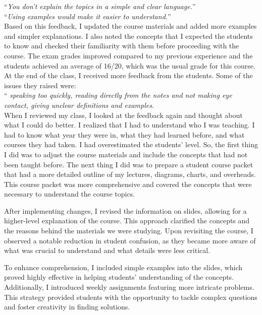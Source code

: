 “\emph {You don’t explain the topics in a simple and clear language.}”\\

“\emph {Using examples would make it easier to understand.}”\\

Based on this feedback, I updated the course materials and added more examples and simpler explanations. I also noted the concepts that I expected the students to know and checked their familiarity with them before proceeding with the course. The exam grades improved compared to my previous experience and the students achieved an average of 16/20, which was the usual grade for this course. At the end of the class, I received more feedback from the students. Some of the issues they raised were: \\

“\emph { speaking too quickly, reading directly from the notes and not making eye contact, giving unclear definitions and examples}.\\

 When I reviewed my class, I looked at the feedback again and thought about what I could do better. I realized that I had to understand who I was teaching. I had to know what year they were in, what they had learned before, and what courses they had taken. I had overestimated the students’ level. So, the first thing I did was to adjust the course materials and include the concepts that had not been taught before. The next thing I did was to prepare a student course packet that had a more detailed outline of my lectures, diagrams, charts, and overheads. This course packet was more comprehensive and covered the concepts that were necessary to understand the course topics.
 
 After implementing changes, I revised the information on slides, allowing for a higher-level explanation of the course. This approach clarified the concepts and the reasons behind the materials we were studying. Upon revisiting the course, I observed a notable reduction in student confusion, as they became more aware of what was crucial to understand and what details were less critical.

To enhance comprehension, I included simple examples into the slides, which proved highly effective in helping students' understanding of the concepts. Additionally, I introduced weekly assignments featuring more intricate problems. This strategy provided students with the opportunity to tackle complex questions and foster creativity in finding solutions.

